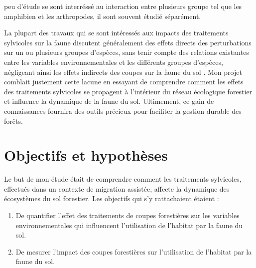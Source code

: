 peu d'étude se sont interréssé au interaction entre plusieurs groupe tel que les amphibien et les arthropodes, il sont souvent étudié séparément.

La plupart des travaux qui se sont intéressés aux impacts des traitements sylvicoles sur la faune discutent généralement des effets directs des perturbations sur un ou plusieurs groupes d'espèces, 
sans tenir compte des relations existantes entre les variables environnementales et les différents groupes d'espèces, 
négligeant ainsi les effets indirects des coupes sur la faune du sol \citep{josephIntegratingOccupancyModels2016,Pollierer2021Diversityfunctional,Kudrin2023metaanalysiseffects}. 
Mon projet comblait justement cette lacune en essayant de comprendre comment les effets des traitements sylvicoles se propagent à l’intérieur du réseau écologique forestier et influence la dynamique de la faune du sol.  
Ultimement, ce gain de connaissances fournira des outils précieux pour faciliter la gestion durable des forêts.




\section*{Objectifs et hypothèses}
\label{sec:objectifs}

Le but de mon étude était de comprendre comment les traitements sylvicoles, effectués dans un contexte de migration assistée, 
affecte la dynamique des écosystèmes du sol forestier. Les objectifs qui s’y rattachaient étaient :

\begin{enumerate}
    \item De quantifier l'effet des traitements de coupes forestières sur les variables environnementales qui influencent l'utilisation de l'habitat par la faune du sol.
    \item De mesurer l'impact des coupes forestières sur l'utilisation de l'habitat par la faune du sol.
\end{enumerate}

